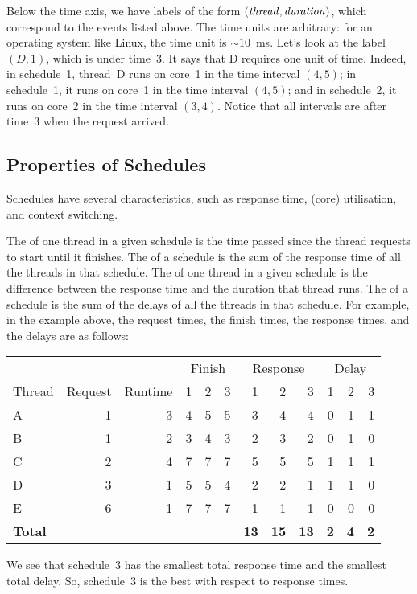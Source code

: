 Below the time axis, we have labels of the form $({\it thread},{\it duration})$,
  which correspond to the events listed above.
The time units are arbitrary:
  for an operating system like Linux, the time unit is $\sim10$~ms.
Let's look at the label $(D,1)$, which is under time~$3$.
It says that D requires one unit of time.
Indeed, in schedule~1, thread~D runs on core~1 in the time interval $(4,5)$;
  in schedule~1, it runs on core~1 in the time interval $(4,5)$;
  and in schedule~2, it runs on core~2 in the time interval $(3,4)$.
Notice that all intervals are after time~$3$ when the request arrived.

\subsection{Properties of Schedules}

Schedules have several characteristics,
  such as response time, (core) utilisation, and context switching.

The  of one thread in a given schedule
  is the time passed since the thread requests to start until it finishes.
The  of a schedule
  is the sum of the response time of all the threads in that schedule.
The  of one thread in a given schedule
  is the difference between the response time and the duration that thread runs.
The  of a schedule
  is the sum of the delays of all the threads in that schedule.
For example, in the example above,
  the request times, the finish times, the response times, and the delays
  are as follows:
\begin{center}
\begin{tabular}{@{}lrrrrrrrrrrr@{}}
\toprule
  & & &
  \multicolumn{3}{c}{Finish} &
  \multicolumn{3}{c}{Response} &
  \multicolumn{3}{c}{Delay} 
  \\
    \cmidrule(lr){4-6} \cmidrule(lr){7-9} \cmidrule(l){10-12}
Thread  & Request & Runtime & 1 & 2 & 3 & 1 & 2 & 3 & 1 & 2 & 3 \\
\midrule
A & 1 & 3 & 4 & 5 & 5 & 3 & 4 & 4 & 0 & 1 & 1 \\
B & 1 & 2 & 3 & 4 & 3 & 2 & 3 & 2 & 0 & 1 & 0 \\
C & 2 & 4 & 7 & 7 & 7 & 5 & 5 & 5 & 1 & 1 & 1 \\
D & 3 & 1 & 5 & 5 & 4 & 2 & 2 & 1 & 1 & 1 & 0 \\
E & 6 & 1 & 7 & 7 & 7 & 1 & 1 & 1 & 0 & 0 & 0 \\
{\bf Total} & & & & & & \bf 13 & \bf 15 & \bf 13 & \bf 2 & \bf 4 & \bf 2 \\
\bottomrule
\end{tabular}
\end{center}
We see that schedule~3 has the smallest total response time
  and the smallest total delay.
So, schedule~3 is the best with respect to response times.

